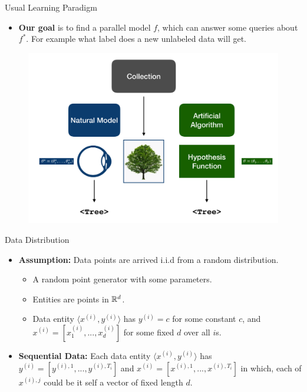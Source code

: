 \documentclass{beamer}
\newcommand{\R}{\Bbb{R}}
\begin{document}
	\begin{frame}{Usual Learning Paradigm}
		
		\begin{itemize}
			\item \alert{\textbf{Our goal}} is to find a parallel model $f$, which can answer some queries about $f^*$. For example what label does a new unlabeled data will get.
		\end{itemize}
	
		\begin{figure}
			\centering
			\includegraphics[scale=0.25]{Pics/learning-algorithm.png}
		\end{figure}
	
	\end{frame}

	\begin{frame}{Data Distribution}
		\begin{itemize}
			\item \alert{\textbf{Assumption:}} Data points are arrived i.i.d from a random distribution.\begin{itemize}
				\item A random point generator with some parameters.
				\item Entities are points in $\R^d$. \pause
				\item Data entity $\langle x^{(i)},y^{(i)} \rangle$ has $y^{(i)} = c$ for some constant $c$, and $x^{(i)} = [x^{(i)}_1 , ... , x^{(i)}_d]$ for some fixed $d$ over all $i$s.
			\end{itemize}\pause
			\item \textbf{Sequential Data:} Each data entity $\langle x^{(i)},y^{(i)} \rangle$ has $y^{(i)} = [y^{(i), 1} , ... , y^{(i), T_i}]$ and $x^{(i)} = [x^{(i), 1} , ... , x^{(i), T_i}]$ in which, each of $x^{(i) , j}$ could be it self a vector of fixed length $d$.
		\end{itemize}
	
	\end{frame}
\end{document}
